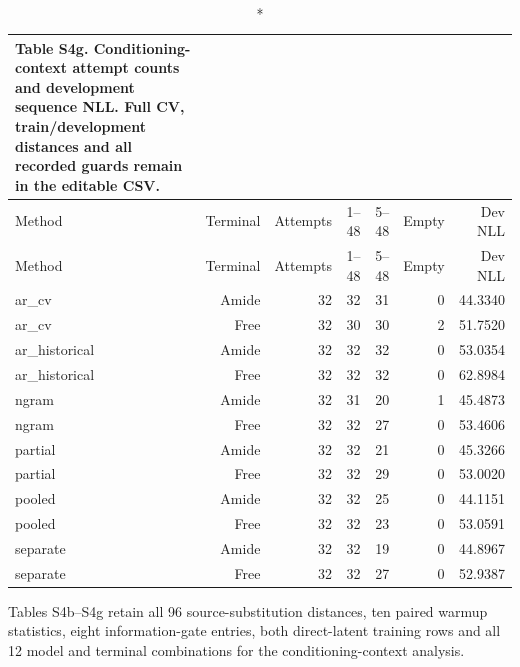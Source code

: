 \begingroup\small\setlength{\tabcolsep}{4pt}\renewcommand{\arraystretch}{1.15}
\begin{longtable}{lrrrrrr}
\caption*{\textbf{Table S4g.} Conditioning-context attempt counts and development sequence NLL. Full CV, train/development distances and all recorded guards remain in the editable CSV.}\\
\toprule
Method & Terminal & Attempts & 1--48 & 5--48 & Empty & Dev NLL \\
\midrule\endfirsthead
Method & Terminal & Attempts & 1--48 & 5--48 & Empty & Dev NLL \\
\midrule\endhead
ar\_cv & Amide & 32 & 32 & 31 & 0 & 44.3340 \\
ar\_cv & Free & 32 & 30 & 30 & 2 & 51.7520 \\
ar\_historical & Amide & 32 & 32 & 32 & 0 & 53.0354 \\
ar\_historical & Free & 32 & 32 & 32 & 0 & 62.8984 \\
ngram & Amide & 32 & 31 & 20 & 1 & 45.4873 \\
ngram & Free & 32 & 32 & 27 & 0 & 53.4606 \\
partial & Amide & 32 & 32 & 21 & 0 & 45.3266 \\
partial & Free & 32 & 32 & 29 & 0 & 53.0020 \\
pooled & Amide & 32 & 32 & 25 & 0 & 44.1151 \\
pooled & Free & 32 & 32 & 23 & 0 & 53.0591 \\
separate & Amide & 32 & 32 & 19 & 0 & 44.8967 \\
separate & Free & 32 & 32 & 27 & 0 & 52.9387 \\
\bottomrule\end{longtable}\endgroup
\noindent Tables S4b--S4g retain all 96 source-substitution distances, ten paired warmup statistics, eight information-gate entries, both direct-latent training rows and all 12 model and terminal combinations for the conditioning-context analysis.
